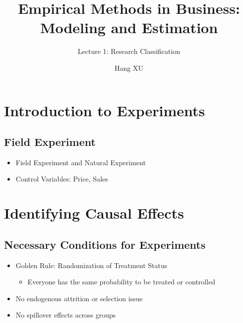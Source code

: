 \documentclass[
]{article}
\title{Empirical Methods in Business: Modeling and Estimation}
\author{Hang XU}
\date{}
\providecommand{\tightlist}{%
  \setlength{\itemsep}{0pt}\setlength{\parskip}{0pt}}
\begin{document}
\maketitle

\subtitle{Lecture 1: Research Classification}

\hypertarget{introduction-to-experiments}{%
\section{Introduction to
Experiments}\label{introduction-to-experiments}}

\hypertarget{field-experiment}{%
\subsection{Field Experiment}\label{field-experiment}}

\begin{itemize}
\tightlist
\item
  Field Experiment and Natural Experiment
\item
  Control Variables: Price, Sales
\end{itemize}

\hypertarget{identifying-causal-effects}{%
\section{Identifying Causal Effects}\label{identifying-causal-effects}}

\hypertarget{necessary-conditions-for-experiments}{%
\subsection{Necessary Conditions for
Experiments}\label{necessary-conditions-for-experiments}}

\begin{itemize}
\tightlist
\item
  Golden Rule: Randomization of Treatment Status

  \begin{itemize}
  \tightlist
  \item
    Everyone has the same probability to be treated or controlled
  \end{itemize}
\item
  No endogenous attrition or selection issue
\item
  No spillover effects across groups
\end{itemize}
\end{document}
